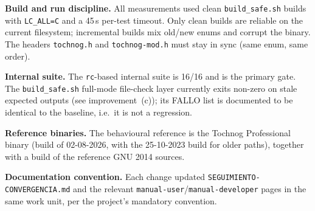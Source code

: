 \documentclass[11pt,a4paper]{report}
\newcommand{\code}[1]{\texttt{#1}}
\begin{document}
\textbf{Build and run discipline.} All measurements used clean
\code{build\_\allowbreak safe.sh} builds with \code{LC\_\allowbreak ALL=C} and a 45\,s per-test timeout.
Only clean builds are reliable on the current filesystem; incremental builds mix
old/new enums and corrupt the binary. The headers \code{tochnog.h} and
\code{tochnog-mod.h} must stay in sync (same enum, same order).

\textbf{Internal suite.} The \code{rc}-based internal suite is 16/16 and is the
primary gate. The \code{build\_\allowbreak safe.sh} full-mode file-check layer currently exits
non-zero on stale expected outputs (see improvement~(c)); its FALLO list is
documented to be identical to the baseline, i.e.\ it is not a regression.

\textbf{Reference binaries.} The behavioural reference is the Tochnog
Professional binary (build of 02-08-2026, with the 25-10-2023 build for older
paths), together with a build of the reference GNU 2014 sources.

\textbf{Documentation convention.} Each change updated
\code{SEGUIMIENTO-\allowbreak CONVERGENCIA.md} and the relevant
\code{manual-user}/\code{manual-developer} pages in the same work unit, per the
project's mandatory convention.
\end{document}
